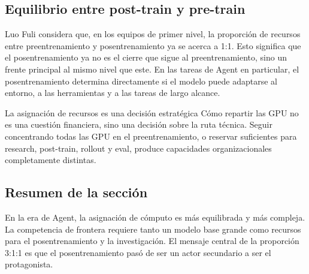 \subsection{Equilibrio entre post-train y pre-train}

Luo Fuli considera que, en los equipos de primer nivel, la proporción de recursos entre preentrenamiento y posentrenamiento ya se acerca a 1:1. Esto significa que el posentrenamiento ya no es el cierre que sigue al preentrenamiento, sino un frente principal al mismo nivel que este. En las tareas de Agent en particular, el posentrenamiento determina directamente si el modelo puede adaptarse al entorno, a las herramientas y a las tareas de largo alcance.

\begin{importantbox}{La asignación de recursos es una decisión estratégica}
Cómo repartir las GPU no es una cuestión financiera, sino una decisión sobre la ruta técnica. Seguir concentrando todas las GPU en el preentrenamiento, o reservar suficientes para research, post-train, rollout y eval, produce capacidades organizacionales completamente distintas.
\end{importantbox}

\subsection{Resumen de la sección}

En la era de Agent, la asignación de cómputo es más equilibrada y más compleja. La competencia de frontera requiere tanto un modelo base grande como recursos para el posentrenamiento y la investigación. El mensaje central de la proporción 3:1:1 es que el posentrenamiento pasó de ser un actor secundario a ser el protagonista.

